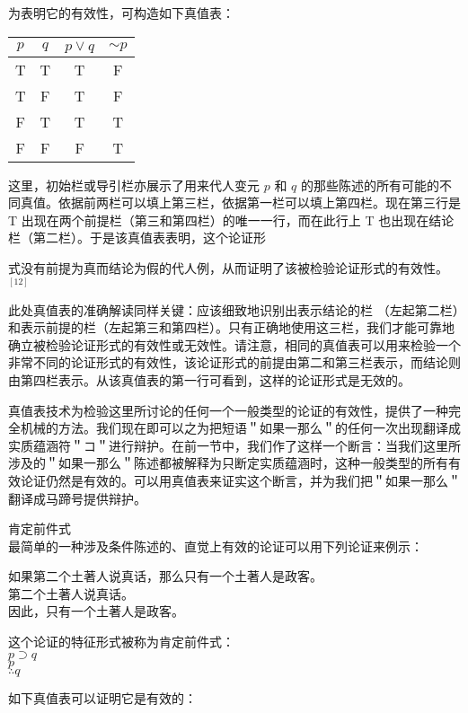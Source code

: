 为表明它的有效性，可构造如下真值表：

\begin{center}
\begin{tabular}{|cccc|}
\hline
$p$ & $q$ & $p \vee q$ & $\sim p$ \\
\hline
T & T & T & F \\
T & F & T & F \\
F & T & T & T \\
F & F & F & T \\
\hline
\end{tabular}
\end{center}

这里，初始栏或导引栏亦展示了用来代人变元 $p$ 和 $q$ 的那些陈述的所有可能的不同真值。依据前两栏可以填上第三栏，依据第一栏可以填上第四栏。现在第三行是 T 出现在两个前提栏（第三和第四栏）的唯一一行，而在此行上 T 也出现在结论栏（第二栏）。于是该真值表表明，这个论证形

式没有前提为真而结论为假的代人例，从而证明了该被检验论证形式的有效性。 ${ }^{[12]}$

此处真值表的准确解读同样关键：应该细致地识别出表示结论的栏 （左起第二栏）和表示前提的栏（左起第三和第四栏）。只有正确地使用这三栏，我们才能可靠地确立被检验论证形式的有效性或无效性。请注意，相同的真值表可以用来检验一个非常不同的论证形式的有效性，该论证形式的前提由第二和第三栏表示，而结论则由第四栏表示。从该真值表的第一行可看到，这样的论证形式是无效的。

真值表技术为检验这里所讨论的任何一个一般类型的论证的有效性，提供了一种完全机械的方法。我们现在即可以之为把短语＂如果一那么＂的任何一次出现翻译成实质蕴涵符＂コ＂进行辩护。在前一节中，我们作了这样一个断言：当我们这里所涉及的＂如果一那么＂陈述都被解释为只断定实质蕴涵时，这种一般类型的所有有效论证仍然是有效的。可以用真值表来证实这个断言，并为我们把＂如果一那么＂翻译成马蹄号提供辩护。

肯定前件式\\
最简单的一种涉及条件陈述的、直觉上有效的论证可以用下列论证来例示：

如果第二个土著人说真话，那么只有一个土著人是政客。\\
第二个土著人说真话。\\
因此，只有一个土著人是政客。

这个论证的特征形式被称为肯定前件式：\\
$p \supset q$\\
$p$\\
$\therefore q$

如下真值表可以证明它是有效的：

